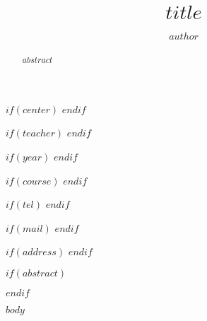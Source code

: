 \documentclass[$if(classoptions)$$classoptions$$endif$]{ifirak}
\begin{document}
\title{$title$}
\author{$author$}

$if(center)$
$endif$

$if(teacher)$
$endif$

$if(year)$
$endif$

$if(course)$
$endif$

$if(tel)$
$endif$

$if(mail)$
$endif$

$if(address)$
$endif$

\maketitle
$if(abstract)$
\begin{abstract}
$abstract$
\end{abstract}
$endif$


$body$
\end{document}
